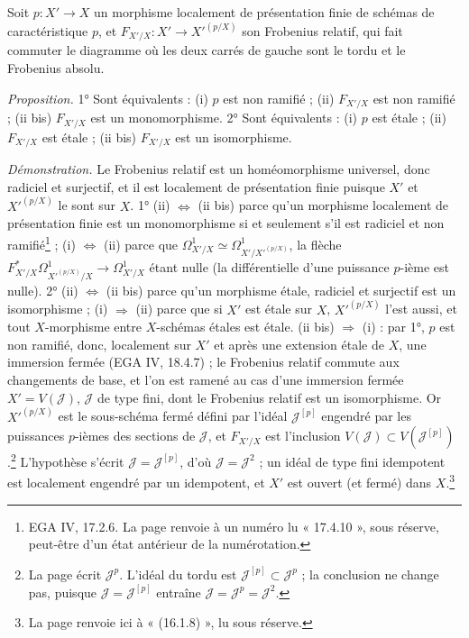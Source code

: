 \documentclass[11pt,a4paper]{article}
\begin{document}
Soit $p : X' \to X$ un morphisme localement de présentation finie de schémas
de caractéristique $p$, et $F_{X'/X} : X' \to X'^{(p/X)}$ son Frobenius
relatif, qui fait commuter le diagramme où les deux carrés de gauche sont le
tordu et le Frobenius absolu.


\emph{Proposition.} 1° Sont équivalents : (i) $p$ est non ramifié ; (ii)
$F_{X'/X}$ est non ramifié ; (ii bis) $F_{X'/X}$ est un monomorphisme.
2° Sont équivalents : (i) $p$ est étale ; (ii) $F_{X'/X}$ est étale ; (ii bis)
$F_{X'/X}$ est un isomorphisme.

\emph{Démonstration.} Le Frobenius relatif est un homéomorphisme universel,
donc radiciel et surjectif, et il est localement de présentation finie
puisque $X'$ et $X'^{(p/X)}$ le sont sur $X$. 1° (ii) $\Leftrightarrow$ (ii bis)
parce qu'un morphisme localement de présentation finie est un monomorphisme si
et seulement s'il est radiciel et non ramifié\footnote{EGA IV, 17.2.6. La page
renvoie à un numéro lu « 17.4.10 », sous réserve, peut-être d'un état
antérieur de la numérotation.} ; (i) $\Leftrightarrow$ (ii) parce que
$\Omega^1_{X'/X} \simeq \Omega^1_{X'/X'^{(p/X)}}$, la flèche
$F_{X'/X}^{*}\Omega^1_{X'^{(p/X)}/X} \to \Omega^1_{X'/X}$ étant nulle (la
différentielle d'une puissance $p$-ième est nulle).
2° (ii) $\Leftrightarrow$ (ii bis) parce qu'un morphisme étale, radiciel et
surjectif est un isomorphisme ; (i) $\Rightarrow$ (ii) parce que si $X'$ est
étale sur $X$, $X'^{(p/X)}$ l'est aussi, et tout $X$-morphisme entre
$X$-schémas étales est étale. (ii bis) $\Rightarrow$ (i) : par 1°, $p$ est non
ramifié, donc, localement sur $X'$ et après une extension étale de $X$, une
immersion fermée (EGA IV, 18.4.7) ; le Frobenius relatif commute aux
changements de base, et l'on est ramené au cas d'une immersion fermée
$X' = V(\mathcal{J})$, $\mathcal{J}$ de type fini, dont le Frobenius relatif est
un isomorphisme. Or $X'^{(p/X)}$ est le sous-schéma fermé défini par l'idéal
$\mathcal{J}^{[p]}$ engendré par les puissances $p$-ièmes des sections de
$\mathcal{J}$, et $F_{X'/X}$ est l'inclusion $V(\mathcal{J}) \subset
V(\mathcal{J}^{[p]})$.\footnote{La page écrit $\mathcal{J}^{p}$. L'idéal du
tordu est $\mathcal{J}^{[p]} \subset \mathcal{J}^{p}$ ; la conclusion ne
change pas, puisque $\mathcal{J} = \mathcal{J}^{[p]}$ entraîne $\mathcal{J} =
\mathcal{J}^{p} = \mathcal{J}^{2}$.} L'hypothèse s'écrit $\mathcal{J} =
\mathcal{J}^{[p]}$, d'où $\mathcal{J} = \mathcal{J}^{2}$ ; un idéal de type
fini idempotent est localement engendré par un idempotent, et $X'$ est
ouvert (et fermé) dans $X$.\footnote{La page renvoie ici à « (16.1.8) », lu
sous réserve.}
\end{document}
